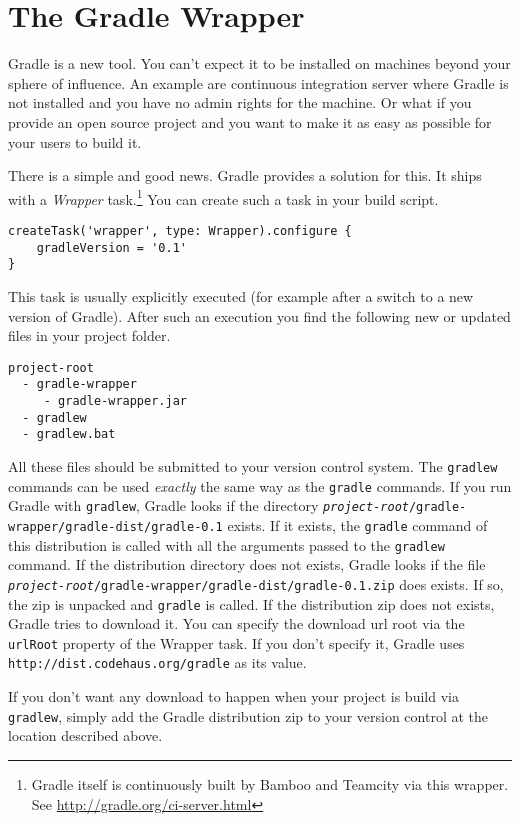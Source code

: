 \chapter{The Gradle Wrapper} %
\label{cha:the_gradle_wrapper}
Gradle is a new tool. You can't expect it to be installed on machines beyond your sphere of influence. An example are continuous integration server where Gradle is not installed and you have no admin rights for the machine. Or what if you provide an open source project and you want to make it as easy as possible for your users to build it.

There is a simple and good news. Gradle provides a solution for this. It ships with a \emph{Wrapper} task.\footnote{Gradle itself is continuously built by Bamboo and Teamcity via this wrapper. See \url{http://gradle.org/ci-server.html}} You can create such a task in your build script.
\begin{Verbatim}
createTask('wrapper', type: Wrapper).configure {
    gradleVersion = '0.1'
}	
\end{Verbatim}
This task is usually explicitly executed (for example after a switch to a new version of Gradle). After such an execution you find the following new or updated files in your project folder.
\begin{Verbatim}
project-root
  - gradle-wrapper
     - gradle-wrapper.jar
  - gradlew
  - gradlew.bat
\end{Verbatim}
\noindent
All these files should be submitted to your version control system. The \texttt{gradlew} commands can be used \emph{exactly} the same way as the \texttt{gradle} commands. If you run Gradle with \texttt{gradlew}, Gradle looks if the directory \texttt{\emph{project-root}/gradle-wrapper/gradle-dist/gradle-0.1} exists. If it exists, the \texttt{gradle} command of this distribution is called with all the arguments passed to the \texttt{gradlew} command.
If the distribution directory does not exists, Gradle looks if the file \texttt{\emph{project-root}/gradle-wrapper/gradle-dist/gradle-0.1.zip} does exists. If so, the zip is unpacked and \texttt{gradle} is called. If the distribution zip does not exists, Gradle tries to download it. You can specify the download url root via the \texttt{urlRoot} property of the Wrapper task. If you don't specify it, Gradle uses \texttt{http://dist.codehaus.org/gradle} as its value. 

If you don't want any download to happen when your project is build via \texttt{gradlew}, simply add the Gradle distribution zip to your version control at the location described above. 

